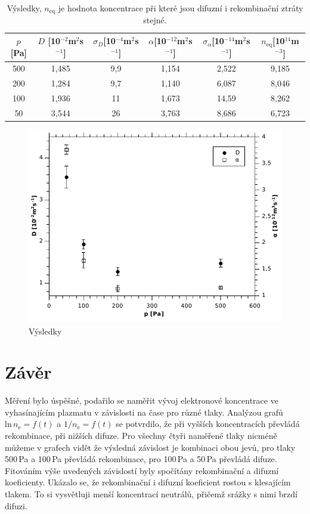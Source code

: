 \documentclass[12pt]{article}
\begin{document}
\begin{table}[htbp]
\begin{center}
\begin{tabular}{|c|c|c|c|c|c|}
\hline
$p$[Pa] & $D$ [10$^{-2}$m$^2$s$^{-1}$] & $\sigma_D$[10$^{-4}$m$^2$s$^{-1}$] & $\alpha$[10$^{-12}$m$^2$s$^{-1}$] & $\sigma_\alpha$[10$^{-14}$m$^2$s$^{-1}$] & $n_{\mathrm{eq}}$[10$^{14}$m$^{-3}$] \\ \hline
500 & 1,485 & 9,9 & 1,154 & 2,522 & 9,185 \\ \hline
200 & 1,284 & 9,7 & 1,140 & 6,087 & 8,046 \\ \hline
100 & 1,936 & 11 & 1,673 & 14,59 & 8,262 \\ \hline
50 & 3,544 & 26 & 3,763 & 8,686 & 6,723 \\ \hline
\end{tabular}
\caption{Výsledky, $n_\mathrm{eq}$ je hodnota koncentrace při které jsou difuzní i rekombinační ztráty stejné.}
\label{vysledky}
\end{center}
\end{table}

\begin{figure}[htbp]
\begin{center}
\includegraphics[width=13.5cm]{Graph4.pdf}
\caption{Výsledky}
\label{vysledkyimg}
\end{center}
\end{figure}

\section{Závěr}
Měření bylo úspěšné, podařilo se naměřit vývoj elektronové koncentrace ve vyhasínajícím plazmatu v závislosti na čase pro různé tlaky. Analýzou grafů $\mathrm{ln}\,n_\mathrm{e} = f(t)$ a $1/n_\mathrm{e} = f(t)$ se potvrdilo, že při vyšších koncentracích převládá rekombinace, při nižších difuze. Pro všechny čtyři naměřené tlaky nicméně můžeme v grafech vidět že výsledná závislost je kombinaci obou jevů, pro tlaky 500\,Pa a 100\,Pa převládá rekombinace, pro 100\,Pa a 50\,Pa převládá difuze. Fitováním výše uvedených závislostí byly spočítány rekombinační a difuzní koeficienty. Ukázalo se, že rekombinační i difuzní koeficient rostou s klesajícím tlakem. To si vysvětluji menší koncentrací neutrálů, přičemž srážky s nimi brzdí difuzi.
\newpage
\end{document}
